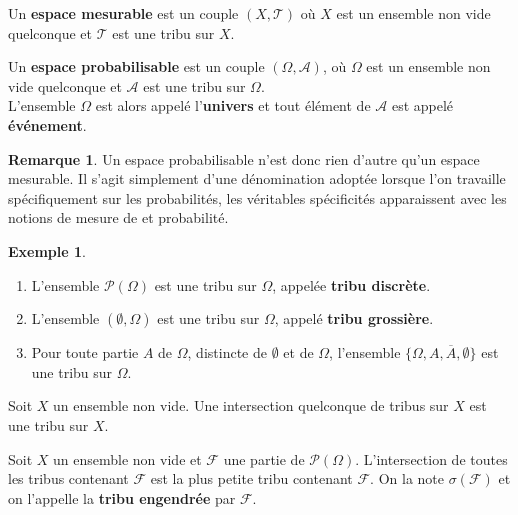 \documentclass[french]{article}
\theoremstyle{plain}
\theoremstyle{definition}
\newtheorem*{ex}{Exemple}
\newtheorem*{rmq}{Remarque}
\theoremstyle{remark}
\begin{document}
\begin{dfn}[HP]
	Un \textbf{espace mesurable} est un couple $(X,\mathcal{T})$ où $X$ est un ensemble non vide quelconque et $\mathcal{T}$ est une tribu sur $X$.
\end{dfn}

\begin{dfn}
	Un \textbf{espace probabilisable} est un couple $(\Omega,\mathcal{A})$, où $\Omega$ est un ensemble non vide quelconque et $\mathcal{A}$ est une tribu sur $\Omega$.\\
	L'ensemble $\Omega$ est alors appelé l'\textbf{univers} et tout élément de $\mathcal{A}$ est appelé \textbf{événement}.
\end{dfn}

\begin{rmq}
	Un espace probabilisable n'est donc rien d'autre qu'un espace mesurable. Il s'agit simplement d'une dénomination adoptée lorsque l'on travaille spécifiquement sur les probabilités, les véritables spécificités apparaissent avec les notions de mesure de et probabilité.
\end{rmq}

\begin{ex}
	\begin{enumerate}
		\item L'ensemble $\mathcal{P}(\Omega)$ est une tribu sur $\Omega$, appelée \textbf{tribu discrète}.
		\item L'ensemble $(\emptyset,\Omega)$ est une tribu sur $\Omega$, appelé \textbf{tribu grossière}.
		\item Pour toute partie $A$ de $\Omega$, distincte de $\emptyset$ et de $\Omega$, l'ensemble $\{\Omega,A,\overline{A},\emptyset\}$ est une tribu sur $\Omega$.
	\end{enumerate}
\end{ex}

\begin{prop}[HP]%
	Soit $X$ un ensemble non vide. Une intersection quelconque de tribus sur $X$ est une tribu sur $X$.
\end{prop}

\begin{dfn}[HP]
	Soit $X$ un ensemble non vide et $\mathcal{F}$ une partie de $\mathcal{P}(\Omega)$. L'intersection de toutes les tribus contenant $\mathcal{F}$ est la plus petite tribu contenant $\mathcal{F}$. On la note $\sigma(\mathcal{F})$ et on l'appelle la \textbf{tribu engendrée} par $\mathcal{F}$.
\end{dfn}
\end{document}
